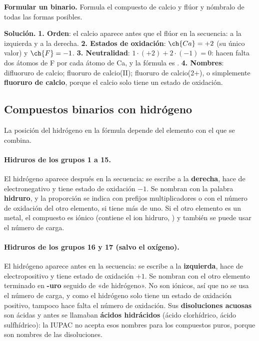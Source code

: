 \begin{example}
    \textbf{Formular un binario.} Formula el compuesto de calcio y flúor y nómbralo de todas las formas posibles.

    \textbf{Solución.} \textbf{1. Orden}: el calcio aparece antes que el flúor en la secuencia:  a la izquierda y
     a la derecha. \textbf{2. Estados de oxidación}: \(\ch{Ca} = +2\) (su único valor) y \(\ch{F} = -1\).
    \textbf{3. Neutralidad}: \(1 \cdot (+2) + 2 \cdot (-1) = 0\): hacen falta dos átomos de F por cada átomo de Ca, y la fórmula
    es . \textbf{4. Nombres}: difluoruro de calcio; fluoruro de calcio(II); fluoruro de calcio(2+), o simplemente
    \textbf{fluoruro de calcio}, porque el calcio solo tiene un estado de oxidación.
\end{example}

\subsection{Compuestos binarios con hidrógeno}\label{sec:ud5-hidruros}

La posición del hidrógeno en la fórmula depende del elemento con el que se combina.

\paragraph{Hidruros de los grupos 1 a 15.} El hidrógeno aparece después en la secuencia: se escribe a la \textbf{derecha}, hace
de electronegativo y tiene estado de oxidación \(-1\). Se nombran con la palabra \textbf{hidruro}, y la proporción se indica con
prefijos multiplicadores o con el número de oxidación del otro elemento, si tiene más de uno. Si el otro elemento es un metal, el
compuesto es iónico (contiene el ion hidruro, ) y también se puede usar el número de carga.

\paragraph{Hidruros de los grupos 16 y 17 (salvo el oxígeno).} El hidrógeno aparece antes en la secuencia: se escribe a la
\textbf{izquierda}, hace de electropositivo y tiene estado de oxidación \(+1\). Se nombran con el otro elemento terminado en
\textbf{-uro} seguido de «de hidrógeno». No son iónicos, así que no se usa el número de carga, y como el hidrógeno solo tiene un
estado de oxidación positivo, tampoco hace falta el número de oxidación. Sus \textbf{disoluciones acuosas} son ácidas y antes se
llamaban \textbf{ácidos hidrácidos} (ácido clorhídrico, ácido sulfhídrico): la IUPAC no acepta esos nombres para los compuestos
puros, porque son nombres de las disoluciones.

